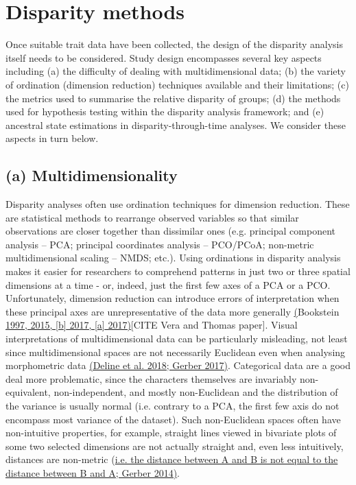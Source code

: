 \hypertarget{disparity-methods}{%
\section{Disparity methods}\label{disparity-methods}}

Once suitable trait data have been collected, the design of the
disparity analysis itself needs to be considered. Study design
encompasses several key aspects including (a) the difficulty of dealing
with multidimensional data; (b) the variety of ordination (dimension
reduction) techniques available and their limitations; (c) the metrics
used to summarise the relative disparity of groups; (d) the methods used
for hypothesis testing within the disparity analysis framework; and (e)
ancestral state estimations in disparity-through-time analyses. We
consider these aspects in turn below.

\hypertarget{a-multidimensionality}{%
\subsection{(a) Multidimensionality}\label{a-multidimensionality}}

Disparity analyses often use ordination techniques for dimension reduction.
These are statistical methods to rearrange observed variables so that similar observations are closer together than dissimilar ones (e.g. principal component analysis -- PCA; principal coordinates analysis -- PCO/PCoA; non-metric multidimensional scaling -- NMDS; etc.).
Using ordinations in disparity analysis makes it easier for researchers to comprehend patterns in just two or three spatial dimensions at a time - or, indeed, just the first few axes of a PCA or a PCO.
Unfortunately, dimension reduction can introduce errors of interpretation when these principal axes are unrepresentative of the data more generally \href{https://paperpile.com/c/sTGYvp/1SD2+sN5d+xaUx+o4w7}{(}Bookstein \href{https://paperpile.com/c/sTGYvp/1SD2+sN5d+xaUx+o4w7}{1997, 2015, {[}b{]} 2017, {[}a{]} 2017)}{[}CITE Vera and Thomas paper{]}. %
Visual interpretations of multidimensional data can be particularly misleading, not least since multidimensional spaces are not necessarily Euclidean even when analysing morphometric data \href{https://paperpile.com/c/sTGYvp/0y4V+QVvv}{(Deline et al. 2018;
Gerber 2017)}.
Categorical data are a good deal more problematic, since the characters themselves are invariably non-equivalent, non-independent, and mostly non-Euclidean and the distribution of the variance is usually normal (i.e. contrary to a PCA, the first few axis do not encompass most variance of the dataset).
Such non-Euclidean spaces often have non-intuitive properties, for example, straight lines viewed in bivariate plots of some two selected dimensions are not actually straight and, even less intuitively, distances are non-metric (\href{https://paperpile.com/c/sTGYvp/SJbC}{i.e. the distance between A and B is not equal to the distance between B and A; Gerber 2014)}.

